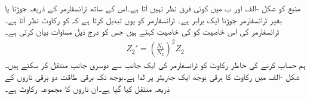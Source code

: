 منبع  کو شکل -الف اور ب میں کوئی فرق نظر نہیں آتا ہے۔اس کے ساتھ ٹرانسفارمر کے ذریعہ  جوڑنا یا بغیر ٹرانسفارمر  جوڑنا ایک برابر ہے۔  ٹرانسفارمر  کو یوں تبدیل کرتا ہے کہ  کو رکاوٹ  نظر آتا ہے۔ ٹرانسفارمر کی اس خاصیت کو   کی خاصیت  کہتے ہیں جس کو درج ذیل مساوات بیان کرتی ہے۔
\begin{align}
Z_2'=\left(\frac{N_1}{N_2} \right)^2  Z_2
\end{align}
ہم حساب کرنے کی خاطر رکاوٹ کو  ٹرانسفارمر کی ایک جانب سے  دوسری جانب منتقل کر سکتے ہیں۔ 
%
شکل -الف میں رکاوٹ  کا برقی بوجھ ایک جنریٹر پر لدا ہے۔بوجھ تک برقی طاقت دو برقی تاروں کے ذریعہ منتقل کیا گیا ہے۔ان تاروں کا مجموعہ رکاوٹ  ہے۔
